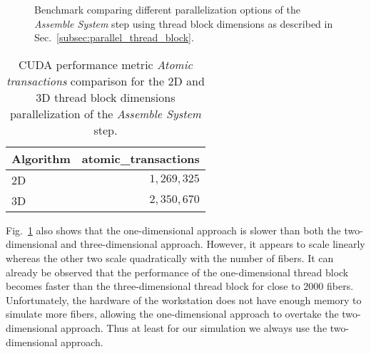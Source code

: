 \begin{figure}[htbp]
  \centering
  \caption[Benchmarking thread block dimensions.]{Benchmark comparing different parallelization options of the \emph{Assemble System} step using thread block dimensions as described in Sec.~\ref{subsec:parallel_thread_block}. }
  \label{fig:bench_cuda_thread_blocks}
\end{figure}

\begin{table}[htbp]
  \begin{center}
    \begin{tabulary}{0.7\textwidth}{LR}
      \toprule
      Algorithm & atomic\_transactions \\
      \midrule
      2D & $1,269,325$ \\
      3D & $2,350,670$ \\
      \bottomrule
    \end{tabulary}
  \end{center}
  \caption[Atomic transactions of 2D vs. 3D thread block dimensions.]{CUDA performance metric \emph{Atomic transactions} comparison for the 2D and 3D thread block dimensions parallelization of the \emph{Assemble System} step.}
  \label{tab:atomic_transactions}
\end{table}

Fig.~\ref{fig:bench_cuda_thread_blocks} also shows that the one-dimensional approach is slower than both the two-dimensional and three-dimensional approach. However, it appears to scale linearly whereas the other two scale quadratically with the number of fibers. It can already be observed that the performance of the one-dimensional thread block becomes faster than the three-dimensional thread block for close to $2000$ fibers. Unfortunately, the hardware of the workstation does not have enough memory to simulate more fibers, allowing the one-dimensional approach to overtake the two-dimensional approach. Thus at least for our simulation we always use the two-dimensional approach.

